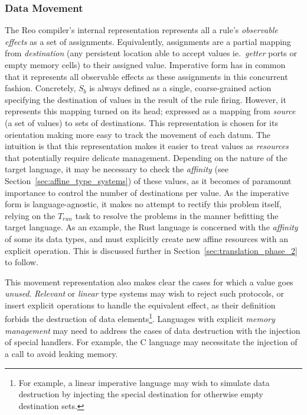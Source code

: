 \subsubsection{Data Movement}
The Reo compiler's internal representation represents all a rule's \textit{observable effects} as a set of assignments. Equivalently, assignments are a partial mapping from \textit{destination} (any persistent location able to accept values ie.\ \textit{getter} ports or empty memory cells) to their assigned value. Imperative form has in common that it represents all observable effects as these assignments in this concurrent fashion. Concretely, $S_b$ is always defined as a single, coarse-grained action specifying the destination of values in the result of the rule firing. However, it represents this mapping turned on its head; expressed as a mapping from \textit{source} (a set of values) to sets of destinations. This representation is chosen for its orientation making more easy to track the movement of each datum. The intuition is that this representation makes it easier to treat values as \textit{resources} that potentially require delicate management. Depending on the nature of the target language, it may be necessary to check the \textit{affinity} (see Section~\ref{sec:affine_type_systems}) of these values, as it becomes of paramount importance to control the number of destinations per value. As the imperative form is language-agnostic, it makes no attempt to rectify this problem itself, relying on the $T_{run}$ task to resolve the problems in the manner befitting the target language. As an example, the Rust language is concerned with the \textit{affinity} of some its data types, and must explicitly create new affine resources with an explicit  operation. This is discussed further in Section~\ref{sec:translation_phase_2} to follow.

This movement representation also makes clear the cases for which a value goes \textit{unused}. \textit{Relevant} or \textit{linear} type systems may wish to reject such protocols, or insert explicit operations to handle the equivalent effect, as their definition forbids the destruction of data elements\footnote{For example, a linear imperative language may wish to simulate data destruction by injecting the special  destination for otherwise empty destination sets.}. Languages with explicit \textit{memory management} may need to address the cases of data destruction with the injection of special handlers. For example, the C language may necessitate the injection of a  call to avoid leaking memory.

